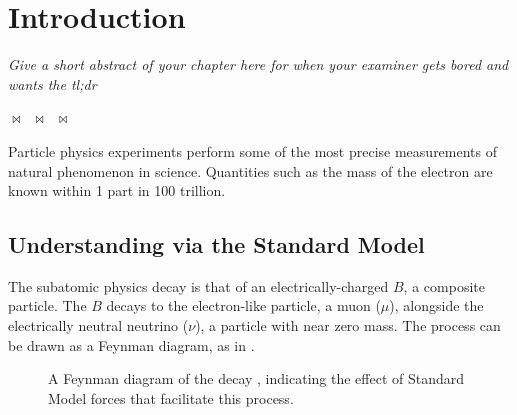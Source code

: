 \chapter{Introduction}\label{chap:intro}
    \textit{Give a short abstract of your chapter here for when your examiner gets bored and wants the tl;dr}
    \begin{center}
      $\bowtie$~$\bowtie$~$\bowtie$
    \end{center}
    Particle physics experiments perform some of the most precise measurements of natural phenomenon in science. 
    Quantities such as the mass of the electron are known within 1 part in 100 trillion\cite{paper:CODATA}.
    \section{Understanding \Bmunu via the Standard Model}
        The subatomic physics decay \Bmunu is that of an electrically-charged $B$, a composite particle.
        The $B$ decays to the electron-like particle, a muon ($\mu$), alongside the electrically neutral neutrino ($\nu$), a particle with near zero mass. 
        The process can be drawn as a Feynman diagram, as in .
        \begin{figure}[htpb]
            \begin{center}
            \end{center}
            \caption{A Feynman diagram of the decay \Bmunu, indicating the effect of Standard Model forces that facilitate this process.}%
            \label{fig:Bmunu}
        \end{figure}
        
